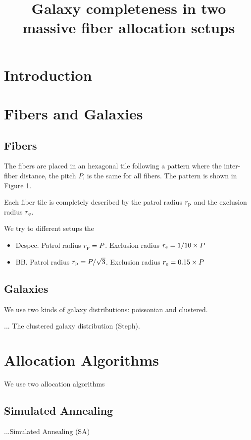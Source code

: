 \documentclass{article}
\title{Galaxy completeness in two massive fiber allocation setups}
\begin{document}
\maketitle
\section{Introduction}

\section{Fibers and Galaxies}

\subsection{Fibers}

The fibers are placed in an hexagonal tile following a pattern where
the inter-fiber distance, the pitch $P$, is the same for all
fibers. The pattern is shown in Figure 1. 

Each fiber tile is completely described by the patrol radius $r_{\rm
  p}$ and the exclusion radius $r_{\rm e}$.


We try to different setups the 
\begin{itemize}
\item {\rm Despec}. Patrol radius $r_{\rm p}=P$. Exclusion radius
  $r_{\rm e}=1/10\times P$
\item {\rm BB}. Patrol radius $r_{\rm p}=P/\sqrt{3}$. Exclusion radius
  $r_{\rm e}=0.15 \times P$
\end{itemize}

\subsection{Galaxies}
We use two kinds of galaxy distributions: poissonian and clustered. 

... The clustered galaxy distribution (Steph).

\section{Allocation Algorithms}

We use two allocation algorithms

\subsection{Simulated Annealing}
...Simulated Annealing (SA)
\end{document}

